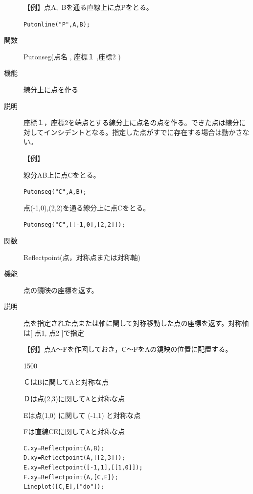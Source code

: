 \documentclass[papersize,a4paper,12pt,uplatex]{jsarticle}
\begin{document}
\begin{description}
\vspace{\baselineskip}
【例】点A,\ Bを通る直線上に点Pをとる。

\verb|Putonline("P",A,B);|

\vspace{\baselineskip}
\hypertarget{putonseg}{}
\item[関数]Putonseg(点名 , 座標１ ,座標2 )
\item[機能]線分上に点を作る
\item[説明]座標１，座標2を端点とする線分上に点名の点を作る。できた点は線分に対してインシデントとなる。指定した点がすでに存在する場合は動かさない。

\vspace{\baselineskip}
【例】

線分AB上に点Cをとる。

 \verb|Putonseg("C",A,B);|

点(-1,0),(2,2)を通る線分上に点Cをとる。

 \verb|Putonseg("C",[[-1,0],[2,2]]);|

\vspace{\baselineskip}
\hypertarget{reflectpoint}{}
\item[関数]Reflectpoint(点，対称点または対称軸)
\item[機能]点の鏡映の座標を返す。
\item[説明]点を指定された点または軸に関して対称移動した点の座標を返す。対称軸は[ 点1, 点2 ]で指定

\vspace{\baselineskip}
【例】点A〜Fを作図しておき，C〜FをAの鏡映の位置に配置する。

\begin{layer}{150}{0}
\end{layer}

\hspace{5mm} ＣはBに関してAと対称な点

\hspace{5mm} Ｄは点(2,3)に関してAと対称な点

\hspace{5mm} Eは点(1,0) に関して (-1,1) と対称な点

\hspace{5mm} Fは直線CEに関してAと対称な点

\begin{verbatim}
C.xy=Reflectpoint(A,B);
D.xy=Reflectpoint(A,[[2,3]]);
E.xy=Reflectpoint([-1,1],[[1,0]]);
F.xy=Reflectpoint(A,[C,E]);
Lineplot([C,E],["do"]);
\end{verbatim}


\end{description}
\end{document}
